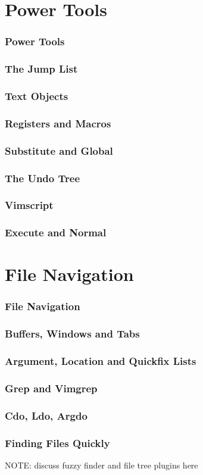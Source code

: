 \documentclass{beamer}
\begin{document}
\section{Power Tools}
\begin{frame}
    \frametitle{Power Tools}
    \tableofcontents[currentsection]
\end{frame}
\begin{frame}
    \frametitle{The Jump List}
\end{frame}
\begin{frame}
    \frametitle{Text Objects}
\end{frame}
\begin{frame}
    \frametitle{Registers and Macros}
\end{frame}
\begin{frame}
    \frametitle{Substitute and Global}
\end{frame}
\begin{frame}
    \frametitle{The Undo Tree}
\end{frame}
\begin{frame}
    \frametitle{Vimscript}
\end{frame}
\begin{frame}
    \frametitle{Execute and Normal}
\end{frame}

\section{File Navigation}
\begin{frame}
    \frametitle{File Navigation}
    \tableofcontents[currentsection]
\end{frame}
\begin{frame}
    \frametitle{Buffers, Windows and Tabs}
\end{frame}
\begin{frame}
    \frametitle{Argument, Location and Quickfix Lists}
\end{frame}
\begin{frame}
    \frametitle{Grep and Vimgrep}
\end{frame}
\begin{frame}
    \frametitle{Cdo, Ldo, Argdo}
\end{frame}
\begin{frame}
    \frametitle{Finding Files Quickly}
    NOTE: discuss fuzzy finder and file tree plugins here
\end{frame}
\end{document}
